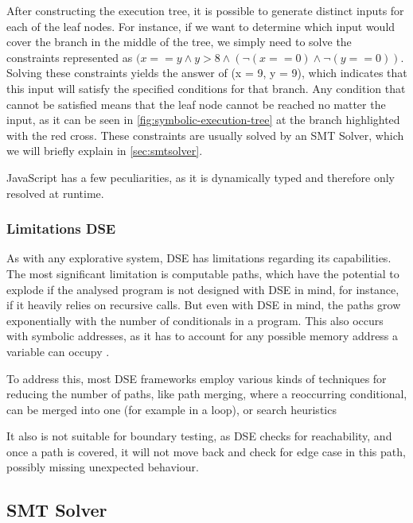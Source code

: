 After constructing the execution tree, it is possible to generate distinct inputs for each of the leaf nodes. For instance, if we want to determine which input would cover the branch in the middle of the tree, we simply need to solve the constraints represented as  $(x == y \land y > 8 \land (\neg( x==0 ) \land \neg(y == 0 ))$. Solving these constraints yields the answer of (x = 9, y = 9), which indicates that this input will satisfy the specified conditions for that branch. 
Any condition that cannot be satisfied means that the leaf node cannot be reached no matter the input, as it can be seen in \autoref{fig:symbolic-execution-tree} at the branch highlighted with the red cross.
These constraints are usually solved by an SMT Solver, which we will briefly explain in \autoref{sec:smtsolver}.


JavaScript has a few peculiarities, as it is dynamically typed and therefore only resolved at runtime. 

\subsubsection{Limitations DSE}

As with any explorative system, DSE has limitations regarding its capabilities. 
The most significant limitation is computable paths, which have the potential to explode if the analysed program is not designed with DSE in mind, for instance, if it heavily relies on recursive calls. 
But even with DSE in mind, the paths grow exponentially with the number of conditionals in a program.  \cite{cadar_symbolic_2013}
This also occurs with symbolic addresses, as it has to account for any possible memory address a variable can occupy \cite{elkarablieh_precise_2009}.  

To address this, most DSE frameworks employ various kinds of techniques for reducing the number of paths, like path merging, where a reoccurring conditional, can be merged into one (for example in a loop), or search heuristics 

It also is not suitable for boundary testing, as DSE checks for reachability, and once a path is covered, it will not move back and check for edge case in this path, possibly missing unexpected behaviour. \cite{berthier_efficient_2023}


\FloatBarrier
\subsection{SMT Solver}
\label{sec:smtsolver}

